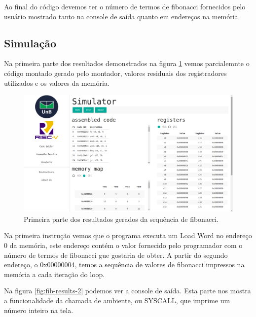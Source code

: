 	Ao final do código devemos ter o número de termos de fibonacci fornecidos pelo usuário mostrado tanto na console de saída quanto em endereços na memória.



\subsection{Simulação}

	
	Na primeira parte dos resultados demonstrados na figura \ref{fig:fib-results-1} vemos parcialemnte o código montado gerado pelo montador, valores residuais dos registradores utilizados e os valores da memória.

	\begin{figure}[h]
	  \centering
	  \includegraphics[width=14cm]{img/fibonacci_results_1.png}
	  \caption{Primeira parte dos resultados gerados da sequência de fibonacci.}
	  \label{fig:fib-results-1}
	\end{figure}

	Na primeira instrução vemos que o programa executa um Load Word no endereço 0 da memória, este endereço contém o valor fornecido pelo programador com o número de termos de fibonacci gue gostaria de obter. A partir do segundo endereço, o 0x00000004, temos a sequência de valores de fibonacci impressos na memória a cada iteração do loop.

	Na figura \ref{fig:fib-results-2} podemos ver a console de saída. Esta parte nos mostra a funcionalidade da chamada de ambiente, ou SYSCALL, que imprime um número inteiro na tela. 

